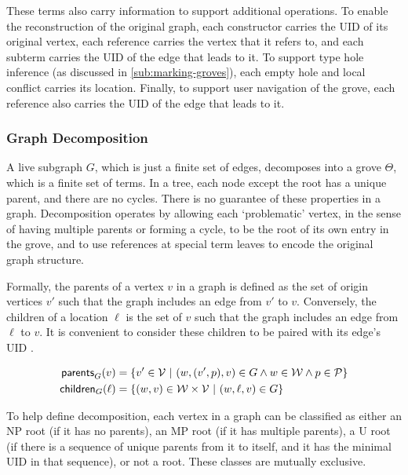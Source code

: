 These terms also carry information to support additional operations. To enable the reconstruction of the original graph, each constructor carries the UID of its original vertex, each reference carries the vertex that it refers to, and each subterm carries the UID of the edge that leads to it. To support type hole inference (as discussed in \autoref{sub:marking-groves}), each empty hole and local conflict carries its location. Finally, to support user navigation of the grove, each reference also carries the UID of the edge that leads to it. 

\subsubsection{Graph Decomposition}%
\label{subsub:Graph Decomposition}

\figureDecompExample

A live subgraph $G$, which is just a finite set of edges, decomposes into a grove $\Theta$, which is a finite set of terms. In a tree, each node except the root has a unique parent, and there are no cycles. There is no guarantee of these properties in a graph. Decomposition operates by allowing each `problematic' vertex, in the sense of having multiple parents or forming a cycle, to be the root of its own entry in the grove, and to use references at special term leaves to encode the original graph structure.

Formally, the parents of a vertex $v$ in a graph is defined as the set of origin vertices $v'$ such that the graph includes an edge from $v'$ to $v$. Conversely, the children of a location $\ell$ is the set of $v$ such that the graph includes an edge from $\ell$ to $v$. It is convenient to consider these children to be paired with its edge's UID . 

\begin{definition}
\begin{align*}
    \mathsf{parents}_{G}(v) &= \left\{v' \in \mathcal{V} ~\vert~(w, (v', p), v) \in G \land w \in \mathcal{W} \land p \in \mathcal{P}\right\}\\
    \mathsf{children}_{G}(\ell) &= \left\{(w,v) \in \mathcal{W}\times\mathcal{V} ~\vert~(w, \ell, v) \in G\right\}
\end{align*}
\end{definition}

To help define decomposition, each vertex in a graph can be classified as either an NP root (if it has no parents), an MP root (if it has multiple parents), a U root (if there is a sequence of unique parents from it to itself, and it has the minimal UID in that sequence), or not a root. These classes are mutually exclusive.

